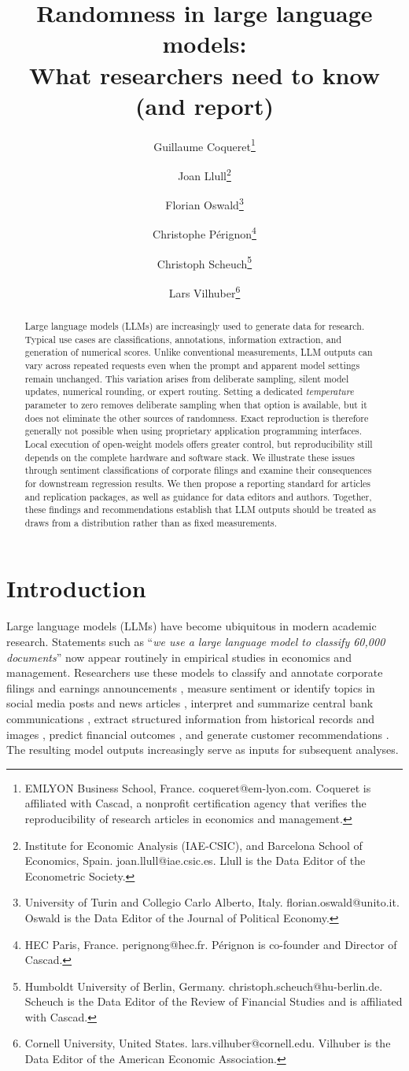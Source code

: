 \documentclass[11pt]{article}
\title{Randomness in large language models: \vspace{1mm} \\ What researchers %
need to know (and report)%
\\\vspace{4mm}}
\author{
Guillaume Coqueret\thanks{EMLYON Business School, France. \Letter  \hspace{1mm} coqueret@em-lyon.com. Coqueret is affiliated with Cascad, a nonprofit certification agency that verifies the reproducibility of research articles in economics and management.} \hspace{6mm}  \and
Joan Llull\thanks{Institute for Economic Analysis (IAE-CSIC), and Barcelona School of Economics, Spain. \Letter \hspace{1mm} joan.llull@iae.csic.es. Llull is the Data Editor of the Econometric Society.}  \hspace{6mm}  \and
Florian Oswald\thanks{University of Turin and Collegio Carlo Alberto, Italy. \Letter \hspace{1mm} florian.oswald@unito.it. Oswald is the Data Editor of the Journal of Political Economy.} \and  
Christophe P\'erignon\thanks{HEC Paris, France. \Letter  \hspace{1mm} perignong@hec.fr. P\'erignon is co-founder and Director of Cascad.}   \and  
Christoph Scheuch\thanks{Humboldt University of Berlin, Germany. \Letter \hspace{1mm} christoph.scheuch@hu-berlin.de. Scheuch is the Data Editor of the Review of Financial Studies and is affiliated with Cascad.}     \and
Lars Vilhuber\thanks{Cornell University, United States. \Letter \hspace{1mm} lars.vilhuber@cornell.edu. Vilhuber is the Data Editor of the American Economic Association.}
}
\date{}
\begin{document}
\maketitle

\begin{abstract}
Large language models (LLMs) are increasingly used to generate data for research. Typical use cases are classifications, annotations, information extraction, and generation of numerical scores. Unlike conventional measurements, LLM outputs can vary across repeated requests even when the prompt and apparent model settings remain unchanged. This variation arises from deliberate sampling, silent model updates, numerical rounding, or expert routing. Setting a dedicated \textit{temperature} parameter to zero removes deliberate sampling when that option is available, but it does not eliminate the other sources of randomness. Exact reproduction is therefore generally not possible when using proprietary application programming interfaces. Local execution of open-weight models offers greater control, but reproducibility still depends on the complete hardware and software stack. We illustrate these issues through sentiment classifications of corporate filings and examine their consequences for downstream regression results. We then propose a reporting standard for articles and replication packages, as well as guidance for data editors and authors. Together, these findings and recommendations establish that LLM outputs should be treated as draws from a distribution rather than as fixed measurements.
\end{abstract}

\section{Introduction}

Large language models (LLMs) have become ubiquitous in modern academic research. Statements such as ``\textit{we use a large language model to classify 60,000 documents}'' now appear routinely in empirical studies in economics and management. %
Researchers use these models to classify and annotate corporate filings \citep{wang2025assessing} and earnings announcements \citep{siano2025news,harford2026}, measure sentiment or identify topics in social media posts and news articles \citep{gilardi2023}, interpret and summarize central bank communications \citep{hansen2023}, extract structured information from historical records and images \citep{dell2025}, predict financial outcomes \citep{lopezlira2025}, and generate customer recommendations \citep{kweon2025uncertainty}. The resulting model outputs increasingly serve as inputs for subsequent analyses.%
\medskip
\end{document}
